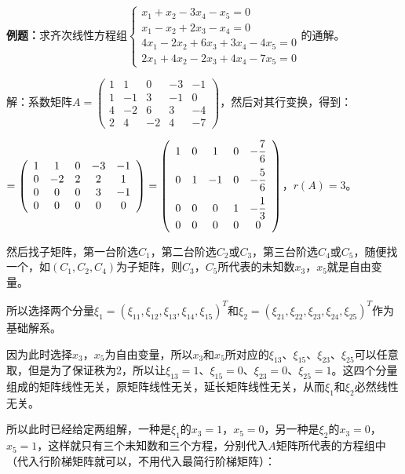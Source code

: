 \documentclass[UTF8, 12pt]{ctexart}
\begin{document}
\textbf{例题：}求齐次线性方程组$\left\{\begin{array}{l}
    x_1+x_2-3x_4-x_5=0 \\
    x_1-x_2+2x_3-x_4=0 \\
    4x_1-2x_2+6x_3+3x_4-4x_5=0 \\
    2x_1+4x_2-2x_3+4x_4-7x_5=0
\end{array}\right.$的通解。

解：系数矩阵$A=\left(\begin{array}{ccccc}
    1 & 1 & 0 & -3 & -1 \\
    1 & -1 & 3 & -1 & 0 \\
    4 & -2 & 6 & 3 & -4 \\
    2 & 4 & -2 & 4 & -7
\end{array}\right)$，然后对其行变换，得到：

$=\left(\begin{array}{ccccc}
    1 & 1 & 0 & -3 & -1 \\
    0 & -2 & 2 & 2 & 1 \\
    0 & 0 & 0 & 3 & -1 \\
    0 & 0 & 0 & 0 & 0
\end{array}\right)=\left(\begin{array}{ccccc}
    1 & 0 & 1 & 0 & -\dfrac{7}{6} \medskip \\
    0 & 1 & -1 & 0 & -\dfrac{5}{6} \medskip \\
    0 & 0 & 0 & 1 & -\dfrac{1}{3} \\
    0 & 0 & 0 & 0 & 0
\end{array}\right)$，$r(A)=3$。

然后找子矩阵，第一台阶选$C_1$，第二台阶选$C_2$或$C_3$，第三台阶选$C_4$或$C_5$，随便找一个，如$(C_1,C_2,C_4)$为子矩阵，则$C_3$，$C_5$所代表的未知数$x_3$，$x_5$就是自由变量。

所以选择两个分量$\xi_1=(\xi_{11},\xi_{12},\xi_{13},\xi_{14},\xi_{15})^T$和$\xi_2=(\xi_{21},\xi_{22},\xi_{23},\xi_{24},\xi_{25})^T$作为基础解系。

因为此时选择$x_3$，$x_5$为自由变量，所以$x_3$和$x_5$所对应的$\xi_{13}$、$\xi_{15}$、$\xi_{23}$、$\xi_{25}$可以任意取，但是为了保证秩为2，所以让$\xi_{13}=1$、$\xi_{15}=0$、$\xi_{23}=0$、$\xi_{25}=1$。这四个分量组成的矩阵线性无关，原矩阵线性无关，延长矩阵线性无关，从而$\xi_1$和$\xi_2$必然线性无关。

所以此时已经给定两组解，一种是$\xi_1$的$x_3=1$，$x_5=0$，另一种是$\xi_2$的$x_3=0$，$x_5=1$，这样就只有三个未知数和三个方程，分别代入$A$矩阵所代表的方程组中（代入行阶梯矩阵就可以，不用代入最简行阶梯矩阵）：
\end{document}
